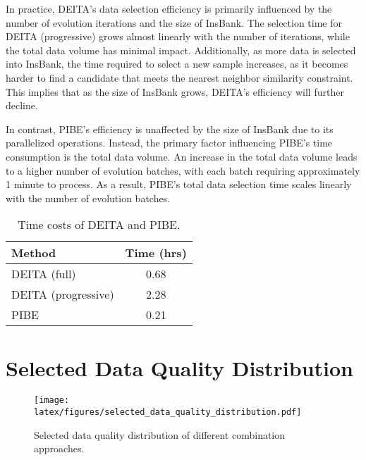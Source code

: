 In practice, DEITA's data selection efficiency is primarily influenced by the number of evolution iterations and the size of InsBank. The selection time for DEITA (progressive) grows almost linearly with the number of iterations, while the total data volume has minimal impact. Additionally, as more data is selected into InsBank, the time required to select a new sample increases, as it becomes harder to find a candidate that meets the nearest neighbor similarity constraint. This implies that as the size of InsBank grows, DEITA's efficiency will further decline.

In contrast, PIBE's efficiency is unaffected by the size of InsBank due to its parallelized operations. Instead, the primary factor influencing PIBE's time consumption is the total data volume. An increase in the total data volume leads to a higher number of evolution batches, with each batch requiring approximately 1 minute to process. As a result, PIBE's total data selection time scales linearly with the number of evolution batches.


\begin{table}[htbp]
    \centering
    \small
    \begin{tabular}{lc}
    \toprule
     Method & Time (hrs) \\
     \midrule
     DEITA (full) & 0.68 \\
     DEITA (progressive) & 2.28 \\
     PIBE & 0.21 \\
    \bottomrule
\end{tabular}
\caption{Time costs of DEITA and PIBE.}
\label{tab: time-cost-comparison}
\end{table}

\onecolumn

\newpage
\section{Selected Data Quality Distribution}

\begin{figure*}[h]
\begin{center}
\texttt{[image: latex/figures/selected\_data\_quality\_distribution.pdf]}
\end{center}
\caption{Selected data quality distribution of different combination approaches.}
\label{fig: selected-data-quality-distribution}
\end{figure*}


